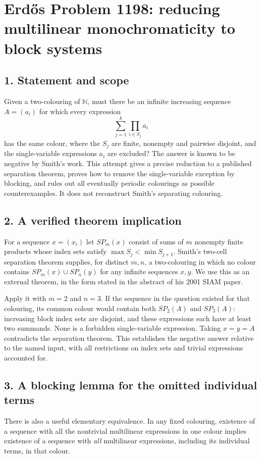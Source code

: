 \section*{Erd\H{o}s Problem 1198: reducing multilinear monochromaticity to block systems}
\subsection*{1. Statement and scope}
Given a two-colouring of $\mathbb N$, must there be an infinite increasing sequence $A=(a_i)$ for which every expression
\[
 \sum_{j=1}^k\prod_{i\in S_j}a_i
\]
has the same colour, where the $S_j$ are finite, nonempty and pairwise disjoint, and the single-variable expressions $a_i$ are excluded? The answer is known to be negative by Smith's work. This attempt gives a precise reduction to a published separation theorem, proves how to remove the single-variable exception by blocking, and rules out all eventually periodic colourings as possible counterexamples. It does not reconstruct Smith's separating colouring.

\subsection*{2. A verified theorem implication}
For a sequence $x=(x_i)$ let $SP_m(x)$ consist of sums of $m$ nonempty finite products whose index sets satisfy $\max S_j<\min S_{j+1}$. Smith's two-cell separation theorem supplies, for distinct $m,n$, a two-colouring in which no colour contains $SP_m(x)\cup SP_n(y)$ for any infinite sequences $x,y$. We use this as an external theorem, in the form stated in the abstract of his 2001 SIAM paper.

Apply it with $m=2$ and $n=3$. If the sequence in the question existed for that colouring, its common colour would contain both $SP_2(A)$ and $SP_3(A)$: increasing block index sets are disjoint, and these expressions each have at least two summands. None is a forbidden single-variable expression. Taking $x=y=A$ contradicts the separation theorem. This establishes the negative answer relative to the named input, with all restrictions on index sets and trivial expressions accounted for.

\subsection*{3. A blocking lemma for the omitted individual terms}
There is also a useful elementary equivalence. In any fixed colouring, existence of a sequence with all the nontrivial multilinear expressions in one colour implies existence of a sequence with \emph{all} multilinear expressions, including its individual terms, in that colour.

